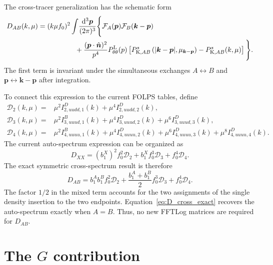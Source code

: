 \documentclass[11pt,a4paper]{article}
\newcommand{\bs}[1]{\boldsymbol{#1}}
\newcommand{\dd}{\mathrm{d}}
\newcommand{\intp}{\int\!\frac{\dd^3\bs{p}}{(2\pi)^3}}
\begin{document}
The cross-tracer generalization has the schematic form
\begin{align}
    D_{AB}(k,\mu)
    ={}&
    (k\mu f_0)^2\intp
    \Bigg\{
        \mathcal{F}_A(\bs{p})
        \mathcal{F}_B(\bs{k}-\bs{p})
    \nonumber\\
    &\hspace{1.4cm}
        +\frac{(\bs{p}\cdot\hat{\bs{n}})^2}{p^4}
        P_{\theta\theta}^{\mathrm{L}}(p)
        \left[
            P_{\mathrm{K},AB}^s
            \left(|\bs{k}-\bs{p}|,\mu_{\bs{k}-\bs{p}}\right)
            -P_{\mathrm{K},AB}^s(k,\mu)
        \right]
    \Bigg\}.
\label{eq:D_cross_integral}
\end{align}
The first term is invariant under the simultaneous exchanges $A\leftrightarrow B$ and $\bs{p}\leftrightarrow\bs{k}-\bs{p}$ after integration.

To connect this expression to the current FOLPS tables, define
\begin{align}
    \mathcal{D}_2(k,\mu)
    ={}&
    \mu^2 I^{D}_{2,uudd,1}(k)
    +\mu^4 I^{D}_{2,uudd,2}(k),
\label{eq:D2_def}
\\
    \mathcal{D}_3(k,\mu)
    ={}&
    \mu^2 I^{B}_{3,uuud,1}(k)
    +\mu^4 I^{D}_{3,uuud,2}(k)
    +\mu^6 I^{D}_{3,uuud,3}(k),
\label{eq:D3_def}
\\
    \mathcal{D}_4(k,\mu)
    ={}&
    \mu^2 I^{B}_{4,uuuu,1}(k)
    +\mu^4 I^{D}_{4,uuuu,2}(k)
    +\mu^6 I^{D}_{4,uuuu,3}(k)
    +\mu^8 I^{D}_{4,uuuu,4}(k).
\label{eq:D4_def}
\end{align}
The current auto-spectrum expression can be organized as
\begin{equation}
    D_{XX}
    =
    (b_1^X)^2f_0^2\mathcal{D}_2
    +b_1^Xf_0^3\mathcal{D}_3
    +f_0^4\mathcal{D}_4.
\label{eq:D_auto_current}
\end{equation}
The exact symmetric cross-spectrum result is therefore
\begin{equation}
\boxed{
    D_{AB}
    =
    b_1^A b_1^B f_0^2\mathcal{D}_2
    +\frac{b_1^A+b_1^B}{2}f_0^3\mathcal{D}_3
    +f_0^4\mathcal{D}_4
    .
}
\label{eq:D_cross_exact}
\end{equation}
The factor $1/2$ in the mixed term accounts for the two assignments of the single density insertion to the two endpoints. Equation~\eqref{eq:D_cross_exact} recovers the auto-spectrum exactly when $A=B$. Thus, no new FFTLog matrices are required for $D_{AB}$.

\section{The $G$ contribution}
\label{sec:G}
\end{document}
